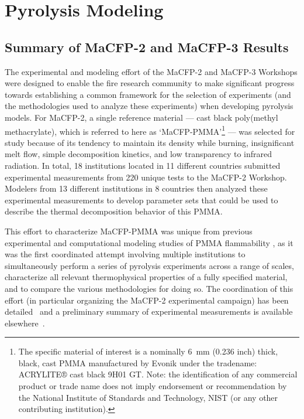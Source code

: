 \documentclass[12pt]{article}
\begin{document}



\clearpage
\section{Pyrolysis Modeling}
\label{sec:Pyrolysis}
\subsection{Summary of MaCFP-2 and MaCFP-3 Results}
The experimental and modeling effort of the MaCFP-2 and MaCFP-3 Workshops were designed to enable the fire research community to make significant progress towards establishing a common framework for the selection of experiments (and the methodologies used to analyze these experiments) when developing pyrolysis models. For MaCFP-2, a single reference material --- cast black poly(methyl methacrylate), which is referred to here as `MaCFP-PMMA'\footnote{The specific material of interest is a nominally 6~mm (0.236 inch) thick, black, cast PMMA manufactured by Evonik under the tradename: ACRYLITE® cast black 9H01 GT. Note: the identification of any commercial product or trade name does not imply endorsement or recommendation by the National Institute of Standards and Technology, NIST (or any other contributing institution).} --- was selected for study because of its tendency to maintain its density while burning, insignificant melt flow, simple decomposition kinetics, and low transparency to infrared radiation. In total, 18 institutions located in 11 different countries submitted experimental measurements from 220 unique tests to the MaCFP-2 Workshop. Modelers from 13 different institutions in 8 countries then analyzed these experimental measurements to develop parameter sets that could be used to describe the thermal decomposition behavior of this PMMA. 

This effort to characterize MaCFP-PMMA was unique from previous experimental \cite{fiola2020comparison,kashiwagi1982study,hirata1985thermal,tewarson1992fire,rhodes1996burning} and computational modeling studies of PMMA flammability \cite{fiola2020comparison,consalvi2008numerical,leventon2015flame,fukumoto2018large}, as it was the first coordinated attempt involving multiple institutions to simultaneously perform a series of pyrolysis experiments across a range of scales, characterize all relevant thermophysical properties of a fully specified material, and to compare the various methodologies for doing so. The coordination of this effort (in particular organizing the MaCFP-2 experimental campaign) has been detailed~\cite{Leventon2022ASTM} and a preliminary summary of experimental measurements is available elsewhere~\cite{leventon2020preliminary}. 
\end{document}
